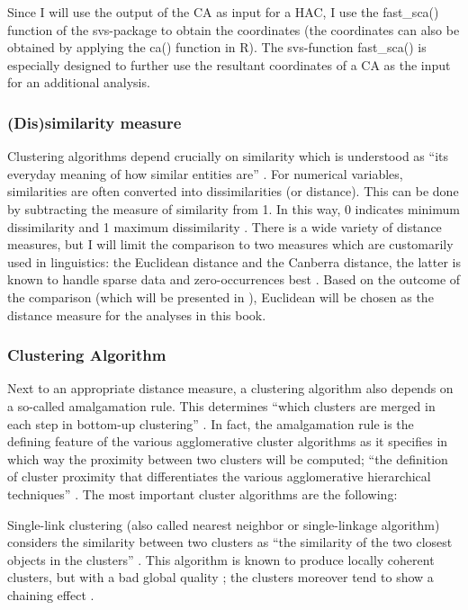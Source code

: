 Since I will use the output of the CA as input for a HAC, I use the fast\_sca() function of the svs{}-package to obtain the coordinates (the coordinates can also be obtained by applying the ca() function in R). The svs{}-function fast\_sca() is especially designed to further use the resultant coordinates of a CA as the input for an additional analysis.

\subsubsection{(Dis)similarity measure}
\label{sec:3.7.2.1}
Clustering algorithms depend crucially on similarity which is understood as “its everyday meaning of how similar entities are” \citep[411]{glynn_cluster_2014}. For numerical variables, similarities are often converted into dissimilarities (or distance). This can be done by subtracting the measure of similarity from 1. In this way, 0 indicates minimum dissimilarity and 1 maximum dissimilarity \citep[415--416]{glynn_cluster_2014}. There is a wide variety of distance measures, but I will limit the comparison to two measures which are customarily used in linguistics: the Euclidean distance and the Canberra distance, the latter is known to handle sparse data and zero-occurrences best \citep[132]{divjak_structuring_2010}. Based on the outcome of the comparison (which will be presented in ), Euclidean will be chosen as the distance measure for the analyses in this book.

\subsubsection{Clustering Algorithm}
\label{sec:3.7.2.2}  
Next to an appropriate distance measure, a clustering algorithm also depends on a so-called amalgamation rule. This determines “which clusters are merged in each step in bottom-up clustering” \citep[503]{manning_foundations_1999}. In fact, the amalgamation rule is the defining feature of the various agglomerative cluster algorithms as it specifies in which way the proximity between two clusters will be computed; “the definition of cluster proximity that differentiates the various agglomerative hierarchical techniques” \citep[517]{tan_introduction_2006}. The most important cluster algorithms are the following:

Single-link clustering (also called nearest neighbor or single-linkage algorithm) considers the similarity between two clusters as “the similarity of the two closest objects in the clusters” \citep[503]{manning_foundations_1999}. This algorithm is known to produce locally coherent clusters, but with a bad global quality \citep[503]{manning_foundations_1999}; the clusters moreover tend to show a chaining effect \citep[504]{manning_foundations_1999}.

